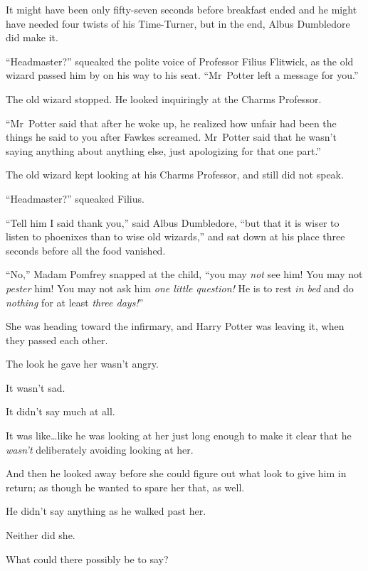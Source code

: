 
It might have been only fifty-seven seconds before breakfast ended and he might have needed four twists of his Time-Turner, but in the end, Albus Dumbledore did make it.

“Headmaster?” squeaked the polite voice of Professor Filius Flitwick, as the old wizard passed him by on his way to his seat. “Mr~Potter left a message for you.”

The old wizard stopped. He looked inquiringly at the Charms Professor.

“Mr~Potter said that after he woke up, he realized how unfair had been the things he said to you after Fawkes screamed. Mr~Potter said that he wasn’t saying anything about anything else, just apologizing for that one part.”

The old wizard kept looking at his Charms Professor, and still did not speak.

“Headmaster?” squeaked Filius.

“Tell him I said thank you,” said Albus Dumbledore, “but that it is wiser to listen to phoenixes than to wise old wizards,” and sat down at his place three seconds before all the food vanished.


“No,” Madam Pomfrey snapped at the child, “you may \emph{not} see him! You may not \emph{pester} him! You may not ask him \emph{one little question!} He is to rest \emph{in bed} and do \emph{nothing} for at least \emph{three days!}”


She was heading toward the infirmary, and Harry Potter was leaving it, when they passed each other.

The look he gave her wasn’t angry.

It wasn’t sad.

It didn’t say much at all.

It was like…like he was looking at her just long enough to make it clear that he \emph{wasn’t} deliberately avoiding looking at her.

And then he looked away before she could figure out what look to give him in return; as though he wanted to spare her that, as well.

He didn’t say anything as he walked past her.

Neither did she.

What could there possibly be to say?

